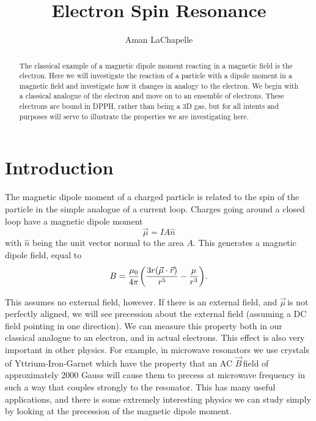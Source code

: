 \documentclass{article}
\title{Electron Spin Resonance}
\author{Aman LaChapelle}
\newcommand{\dipole}{$\vec{\mu}\,$}
\newcommand{\B}{$\vec{B}\,$}
\begin{document}
\raggedright
\maketitle

\begin{abstract}
	The classical example of a magnetic dipole moment reacting in a magnetic field is the electron.  Here we will investigate the reaction of a particle with a dipole moment in a magnetic field and investigate how it changes in analogy to the electron.  We begin with a classical analogue of the electron and move on to an ensemble of electrons.  These electrons are bound in DPPH, rather than being a 3D gas, but for all intents and purposes will serve to illustrate the properties we are investigating here.
\end{abstract}

\tableofcontents
\newpage

\section{Introduction}
	The magnetic dipole moment of a charged particle is related to the spin of the particle in the simple analogue of a current loop.  Charges going around a closed loop have a magnetic dipole moment
	\begin{equation*}
		\vec{\mu} = IA\hat{n}
	\end{equation*}
	with $\hat{n}$ being the unit vector normal to the area $A$.  This generates a magnetic dipole field, equal to
	\begin{equation*}
		B = \frac{\mu_0}{4\pi}\bigg{(}\frac{3r(\vec{\mu} \cdot \vec{r})}{r^5} - \frac{\mu}{r^3}\bigg{)}.
	\end{equation*}

	This assumes no external field, however.  If there is an external field, and \dipole is not perfectly aligned, we will see precession about the external field (assuming a DC field pointing in one direction).  We can measure this property both in our classical analogue to an electron, and in actual electrons.  This effect is also very important in other physics.  For example, in microwave resonators we use crystals of Yttrium-Iron-Garnet which have the property that an AC \B field of approximately 2000 Gauss will cause them to precess at microwave frequency in such a way that couples strongly to the resonator.  This has many useful applications, and there is some extremely interesting physics we can study simply by looking at the precession of the magnetic dipole moment.
\end{document}
